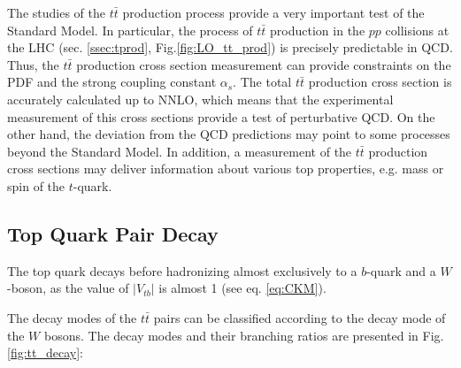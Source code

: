 The studies of the $t\bar{t}$ production process provide a very important test of the Standard Model. 
In particular, the process of $t\bar{t}$ production in the $pp$ collisions at the LHC (sec. \ref{ssec:tprod}, Fig.\ref{fig:LO_tt_prod})
is precisely predictable in QCD. Thus, the $t\bar{t}$ production cross section measurement can provide constraints on the PDF and the strong coupling constant $\alpha_s$.
The total $t\bar{t}$ production cross section is accurately calculated up to NNLO, which means that the experimental measurement of this cross sections provide a 
test of perturbative QCD.
On the other hand, the deviation from the QCD predictions may point to some processes beyond the Standard Model. In addition, a measurement of the $t\bar{t}$ production 
cross sections may deliver information about various top properties, e.g. mass or spin of the $t$-quark.

\subsection{Top Quark Pair Decay}\label{ssec:tdecay}

The top quark decays before hadronizing almost exclusively to a $b$-quark and a $W$-boson, as the value of $|V_{tb}|$ is almost 1 (see eq. \ref{eq:CKM}).

The decay modes of the $t\bar{t}$ pairs can be classified according to the decay mode of the $W$ bosons. The decay modes and their branching ratios are presented
in Fig. \ref{fig:tt_decay}:

